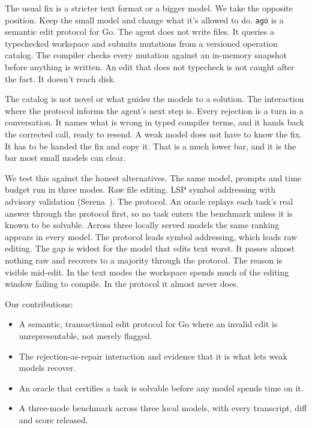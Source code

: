 \documentclass[11pt]{article}
\begin{document}
The usual fix is a stricter text format or a bigger model. We take the
opposite position. Keep the small model and change what it's allowed
to do. \texttt{ago} is a semantic edit protocol for Go. The agent does
not write files. It queries a typechecked workspace and submits
mutations from a versioned operation catalog. The compiler checks every
mutation against an in-memory snapshot before anything is written. An
edit that does not typecheck is not caught after the fact. It doesn't
reach disk.

The catalog is not novel or what guides the models to a solution.
The interaction where the protocol informs the agent's next step is. Every
rejection is a turn in a conversation. It names what is wrong in typed
compiler terms, and it hands back the corrected call, ready to resend.
A weak model does not have to know the fix. It has to be handed the fix
and copy it. That is a much lower bar, and it is the bar most small
models can clear.

We test this against the honest alternatives. The same model, prompts
and time budget run in three modes. Raw file editing.
LSP symbol addressing with advisory validation (Serena~\cite{serena}).
The protocol. An oracle replays each task's real answer through the
protocol first, so no task enters the benchmark unless it is known to be
solvable. Across three locally served models the same ranking appears
in every model. The protocol leads symbol addressing, which leads raw
editing. The gap
is widest for the model that edits text worst. It passes almost nothing
raw and recovers to a majority through the protocol. The reason is
visible mid-edit. In the text modes the workspace spends much of the
editing window failing to compile. In the protocol it almost never
does.

Our contributions:
\begin{itemize}
\item A semantic, transactional edit protocol for Go where an invalid
edit is unrepresentable, not merely flagged.
\item The rejection-as-repair interaction and evidence that it is what
lets weak models recover.
\item An oracle that certifies a task is solvable before any model
spends time on it.
\item A three-mode benchmark across three local models, with every
transcript, diff and score released.
\end{itemize}
\end{document}

